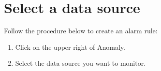 \documentclass[letterpaper,10pt,english]{sphinxmanual}
\begin{document}
\section{Select a data source}
\label{\detokenize{anomaly/part02/index:select-datasource}}\label{\detokenize{anomaly/part02/index:id2}}
Follow the procedure below to create an alarm rule:
\begin{enumerate}
\def\theenumi{\arabic{enumi}}
\def\labelenumi{\theenumi .}
\makeatletter\def\p@enumii{\p@enumi \theenumi .}\makeatother
\item {} 
Click  on the upper right of Anomaly.
\begin{quote}

\begin{figure}[H]
\centering

\noindent{}
\end{figure}
\end{quote}

\item {} 
Select the data source you want to monitor.
\begin{quote}

\begin{figure}[H]
\centering

\noindent{}
\end{figure}
\end{quote}

\end{enumerate}
\end{document}
